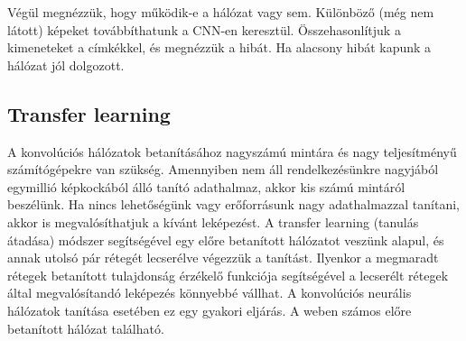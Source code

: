 Végül megnézzük, hogy működik-e a hálózat vagy sem. Különböző (még nem látott) képeket továbbíthatunk a CNN-en keresztül. Összehasonlítjuk a kimeneteket a címkékkel, és megnézzük a hibát. Ha alacsony hibát kapunk a hálózat jól dolgozott.

\subsection{Transfer learning}

A konvolúciós hálózatok betanításához nagyszámú mintára és nagy teljesítményű számítógépekre van szükség. Amennyiben nem áll rendelkezésünkre nagyjából egymillió képkockából álló tanító adathalmaz, akkor kis számú mintáról beszélünk. Ha nincs lehetőségünk vagy erőforrásunk nagy adathalmazzal tanítani, akkor is megvalósíthatjuk a kívánt leképezést. A transfer learning (tanulás átadása) módszer segítségével egy előre betanított hálózatot veszünk alapul, és annak utolsó pár rétegét lecserélve végezzük a tanítást. Ilyenkor a megmaradt rétegek betanított tulajdonság érzékelő funkciója segítségével a lecserélt rétegek által megvalósítandó leképezés könnyebbé vállhat. A konvolúciós neurális hálózatok tanítása esetében ez egy gyakori eljárás. A weben számos előre betanított hálózat található.
